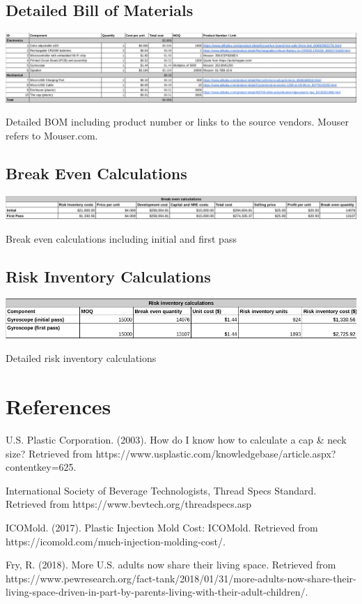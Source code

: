 \documentclass[12pt]{article}
\begin{document}
		\subsection*{Detailed Bill of Materials}
		\begin{table}[H]
			\includegraphics[width=\textwidth]{bom_large.png}
			
			\caption{Detailed BOM including product number or links to the source vendors. Mouser refers to Mouser.com.
			}
		\end{table}
		\subsection*{Break Even Calculations}
				\begin{table}[H]
			\includegraphics[width=\textwidth]{breakeven.png}
			
			\caption{ Break even calculations including initial and first pass}
		\end{table}
		\subsection*{Risk Inventory Calculations}
				\begin{table}[H]
			\includegraphics[width=\textwidth]{risk.png}
			\caption{Detailed risk inventory calculations}
		\end{table}
	
			
	\section*{References}

	U.S. Plastic Corporation. (2003). How do I know how to calculate a cap \& neck size? Retrieved from https://www.usplastic.com/knowledgebase/article.aspx?contentkey=625. 
	
	International Society of Beverage Technologists, Thread Specs Standard. Retrieved from https://www.bevtech.org/threadspecs.asp
	
	ICOMold. (2017). Plastic Injection Mold Cost: ICOMold. Retrieved from https://icomold.com/much-injection-molding-cost/. 
	
	Fry, R. (2018). More U.S. adults now share their living space. Retrieved from https://www.pewresearch.org/fact-tank/2018/01/31/more-adults-now-share-their-living-space-driven-in-part-by-parents-living-with-their-adult-children/. 
\end{document}
